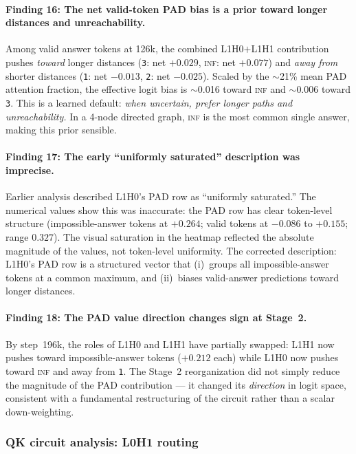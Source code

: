 \documentclass[11pt, a4paper]{article}
\begin{document}
\paragraph{Finding 16: The net valid-token PAD bias is a prior toward longer
distances and unreachability.}
Among valid answer tokens at 126k, the combined L1H0$+$L1H1 contribution pushes
\emph{toward} longer distances (\texttt{3}: net $+0.029$, \textsc{inf}: net
$+0.077$) and \emph{away from} shorter distances (\texttt{1}: net $-0.013$,
\texttt{2}: net $-0.025$). Scaled by the $\sim$21\% mean PAD attention fraction,
the effective logit bias is $\sim$0.016 toward \textsc{inf} and $\sim$0.006
toward \texttt{3}.  This is a learned default: \emph{when uncertain, prefer
longer paths and unreachability.}  In a 4-node directed graph, \textsc{inf} is
the most common single answer, making this prior sensible.

\paragraph{Finding 17: The early ``uniformly saturated'' description was imprecise.}
Earlier analysis described L1H0's PAD row as ``uniformly saturated.'' The
numerical values show this was inaccurate: the PAD row has clear token-level
structure (impossible-answer tokens at $+0.264$; valid tokens at $-0.086$ to
$+0.155$; range $0.327$). The visual saturation in the heatmap reflected the
absolute magnitude of the values, not token-level uniformity. The corrected
description: L1H0's PAD row is a structured vector that (i)~groups all
impossible-answer tokens at a common maximum, and (ii)~biases valid-answer
predictions toward longer distances.

\paragraph{Finding 18: The PAD value direction changes sign at Stage~2.}
By step~196k, the roles of L1H0 and L1H1 have partially swapped: L1H1 now
pushes toward impossible-answer tokens ($+0.212$ each) while L1H0 now pushes
toward \textsc{inf} and away from \texttt{1}.  The Stage~2 reorganization did
not simply reduce the magnitude of the PAD contribution --- it changed its
\emph{direction} in logit space, consistent with a fundamental restructuring of
the circuit rather than a scalar down-weighting.

\subsubsection{QK circuit analysis: L0H1 routing}
\label{sec:qk-analysis}
\end{document}
